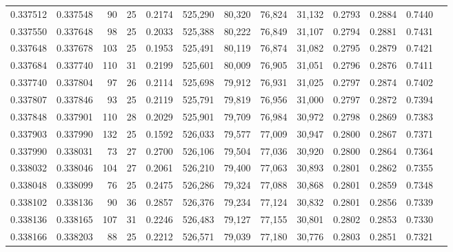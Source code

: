 \begin{tabular}{rrrrrrrrrrrrr}
0.337512 & 0.337548 &    90 &  25 &                                     0.2174 & 525,290 &  80,320 &  76,824 &  31,132 & 0.2793 & 0.2884 & 0.7440 \\
0.337550 & 0.337648 &    98 &  25 &                                     0.2033 & 525,388 &  80,222 &  76,849 &  31,107 & 0.2794 & 0.2881 & 0.7431 \\
0.337648 & 0.337678 &   103 &  25 &                                     0.1953 & 525,491 &  80,119 &  76,874 &  31,082 & 0.2795 & 0.2879 & 0.7421 \\
0.337684 & 0.337740 &   110 &  31 &                                     0.2199 & 525,601 &  80,009 &  76,905 &  31,051 & 0.2796 & 0.2876 & 0.7411 \\
0.337740 & 0.337804 &    97 &  26 &                                     0.2114 & 525,698 &  79,912 &  76,931 &  31,025 & 0.2797 & 0.2874 & 0.7402 \\
0.337807 & 0.337846 &    93 &  25 &                                     0.2119 & 525,791 &  79,819 &  76,956 &  31,000 & 0.2797 & 0.2872 & 0.7394 \\
0.337848 & 0.337901 &   110 &  28 &                                     0.2029 & 525,901 &  79,709 &  76,984 &  30,972 & 0.2798 & 0.2869 & 0.7383 \\
0.337903 & 0.337990 &   132 &  25 &                                     0.1592 & 526,033 &  79,577 &  77,009 &  30,947 & 0.2800 & 0.2867 & 0.7371 \\
0.337990 & 0.338031 &    73 &  27 &                                     0.2700 & 526,106 &  79,504 &  77,036 &  30,920 & 0.2800 & 0.2864 & 0.7364 \\
0.338032 & 0.338046 &   104 &  27 &                                     0.2061 & 526,210 &  79,400 &  77,063 &  30,893 & 0.2801 & 0.2862 & 0.7355 \\
0.338048 & 0.338099 &    76 &  25 &                                     0.2475 & 526,286 &  79,324 &  77,088 &  30,868 & 0.2801 & 0.2859 & 0.7348 \\
0.338102 & 0.338136 &    90 &  36 &                                     0.2857 & 526,376 &  79,234 &  77,124 &  30,832 & 0.2801 & 0.2856 & 0.7339 \\
0.338136 & 0.338165 &   107 &  31 &                                     0.2246 & 526,483 &  79,127 &  77,155 &  30,801 & 0.2802 & 0.2853 & 0.7330 \\
0.338166 & 0.338203 &    88 &  25 &                                     0.2212 & 526,571 &  79,039 &  77,180 &  30,776 & 0.2803 & 0.2851 & 0.7321 \\

\end{tabular}

